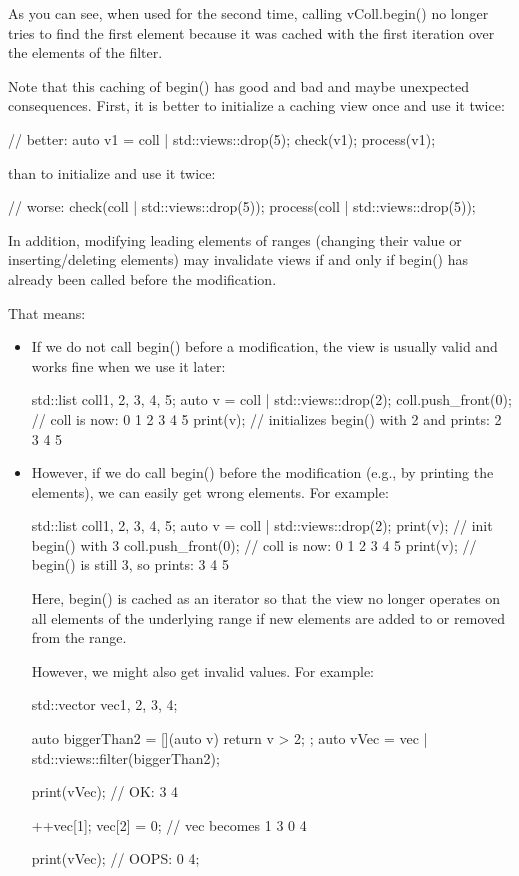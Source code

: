 As you can see, when used for the second time, calling vColl.begin() no longer tries to find the first element because it was cached with the first iteration over the elements of the filter.

Note that this caching of begin() has good and bad and maybe unexpected consequences. First, it is better to initialize a caching view once and use it twice:

\begin{cpp}
// better:
auto v1 = coll | std::views::drop(5);
check(v1);
process(v1);
\end{cpp}

than to initialize and use it twice:

\begin{cpp}
// worse:
check(coll | std::views::drop(5));
process(coll | std::views::drop(5));
\end{cpp}

In addition, modifying leading elements of ranges (changing their value or inserting/deleting elements) may invalidate views if and only if begin() has already been called before the modification.

That means:

\begin{itemize}
\item
If we do not call begin() before a modification, the view is usually valid and works fine when we use it later:

\begin{cpp}
std::list coll{1, 2, 3, 4, 5};
auto v = coll | std::views::drop(2);
coll.push_front(0); // coll is now: 0 1 2 3 4 5
print(v); // initializes begin() with 2 and prints: 2 3 4 5
\end{cpp}

\item
However, if we do call begin() before the modification (e.g., by printing the elements), we can easily get wrong elements. For example:

\begin{cpp}
std::list coll{1, 2, 3, 4, 5};
auto v = coll | std::views::drop(2);
print(v); // init begin() with 3
coll.push_front(0); // coll is now: 0 1 2 3 4 5
print(v); // begin() is still 3, so prints: 3 4 5
\end{cpp}

Here, begin() is cached as an iterator so that the view no longer operates on all elements of the underlying range if new elements are added to or removed from the range.

However, we might also get invalid values. For example:

\begin{cpp}
std::vector vec{1, 2, 3, 4};

auto biggerThan2 = [](auto v){ return v > 2; };
auto vVec = vec | std::views::filter(biggerThan2);

print(vVec); // OK: 3 4

++vec[1];
vec[2] = 0; // vec becomes 1 3 0 4

print(vVec); // OOPS: 0 4;
\end{cpp}

\end{itemize}

